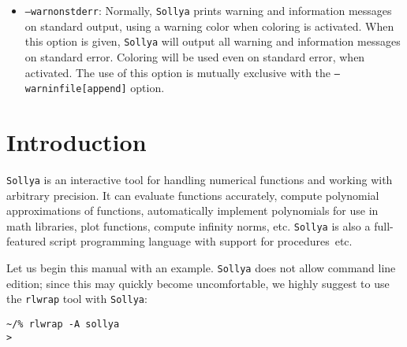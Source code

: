 \documentclass[a4paper]{article}
\newcommand{\sollya}{\texttt{Sollya}\xspace}
\newcommand{\rlwrap}{\texttt{rlwrap}\xspace}
\begin{document}
\begin{itemize}
  warning and information messages together with all other displayed
  information on either standard output or standard error. This option
  allows all warning and information messages to get redirected to a
  file. The filename to be used must be given after the option.  When
  \texttt{--warninfile} is used, the existing content (if any) of the
  file is first removed before writing to the file. With
  \texttt{--warninfileappend}, the messages are appended to an
  existing file. Even if coloring is used for the displaying all other
  \sollya output, no coloring sequences are ever written to the
  file. Let us emphasize on the fact that any file of a unixoid system
  can be used for output, for instance also a named pipe. This allows
  for error messaging to be performed on a separate terminal. The use
  of this option is mutually exclusive with the
  \texttt{--warnonstderr} option.
\item \texttt{--warnonstderr}: Normally, \sollya prints warning and
  information messages on standard output, using a warning color 
  when coloring is activated. When this option is given, \sollya will 
  output all warning and information messages on standard error. Coloring
  will be used even on standard error, when activated. The use of 
  this option is mutually exclusive with the \texttt{--warninfile[append]} 
  option.
\end{itemize}


\section{Introduction}
\sollya is an interactive tool for handling numerical functions and working with arbitrary precision. It can evaluate functions accurately, compute polynomial approximations of functions, automatically implement polynomials for use in math libraries, plot functions, compute infinity norms, etc. \sollya is also a full-featured script programming language with support for procedures~etc.

Let us begin this manual with an example. \sollya does not allow command line edition; since this may quickly become uncomfortable, we highly suggest to use the \rlwrap tool with \sollya:

\begin{center}\begin{minipage}{15cm}\begin{Verbatim}[frame=single]
~/% rlwrap -A sollya
>
\end{Verbatim}
\end{minipage}\end{center}
\end{document}
